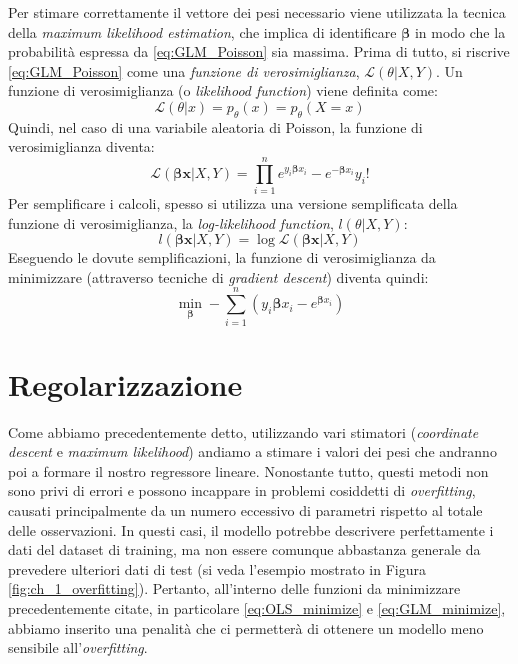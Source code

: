 Per stimare correttamente il vettore dei pesi necessario viene utilizzata la tecnica della \textit{maximum likelihood 
estimation}, che implica di identificare $\bm{\beta}$ in modo che la probabilità espressa da \eqref{eq:GLM_Poisson} sia
massima. Prima di tutto, si riscrive \eqref{eq:GLM_Poisson} come una \textit{funzione di verosimiglianza}, $\mathcal{L}(\theta | X, Y)$. Un funzione di verosimiglianza (o \textit{likelihood function}) viene definita come:
\begin{equation}
\mathcal{L}(\theta | x ) = p_{\theta}(x) = p_{\theta}(X=x)
\end{equation}
Quindi, nel caso di una variabile aleatoria di Poisson, la funzione di verosimiglianza diventa:
\begin{equation}
\mathcal{L}(\bm{\beta x}  | X, Y ) = \prod_{i=1}^n {e^{y_i \bm{\beta} x_i}-e^{-\bm{\beta} x_i}}{y_i!} \label{eq:GLM_Likelihood}
\end{equation}
Per semplificare i calcoli, spesso si utilizza una versione semplificata della funzione di verosimiglianza, la \textit{log-likelihood function}, $l(\theta | X, Y)$:
\begin{equation}
l(\bm{\beta x}  | X, Y) = \log{\mathcal{L}(\bm{\beta x}  | X, Y )}
\end{equation}
Eseguendo le dovute semplificazioni, la funzione di verosimiglianza da minimizzare (attraverso tecniche di \textit{gradient descent}) diventa quindi:
\begin{equation}
	\min_{\bm{\beta}} -\sum_{i=1}^n (y_i\bm{\beta} x_i - e^{\bm{\beta} x_i} ) \label{eq:GLM_minimize}
\end{equation} 

\section{Regolarizzazione}
\bigskip

Come abbiamo precedentemente detto, utilizzando vari stimatori (\textit{coordinate descent} e \textit{maximum likelihood}) 
andiamo a stimare i valori dei pesi che andranno poi a formare il nostro regressore lineare. Nonostante tutto, questi metodi 
non sono privi di errori e possono incappare in problemi cosiddetti di \textit{overfitting}, causati principalmente da un 
numero eccessivo di parametri rispetto al totale delle osservazioni. In questi casi, il modello potrebbe descrivere 
perfettamente i dati del dataset di training, ma non essere comunque abbastanza generale da prevedere ulteriori dati di test (si veda l'esempio mostrato in Figura \ref{fig:ch_1_overfitting}). 
Pertanto, all'interno delle funzioni da minimizzare precedentemente citate, in particolare \eqref{eq:OLS_minimize} e 
\eqref{eq:GLM_minimize}, abbiamo inserito una penalità che ci permetterà di ottenere un modello meno sensibile 
all'\textit{overfitting}. 
\bigskip 

